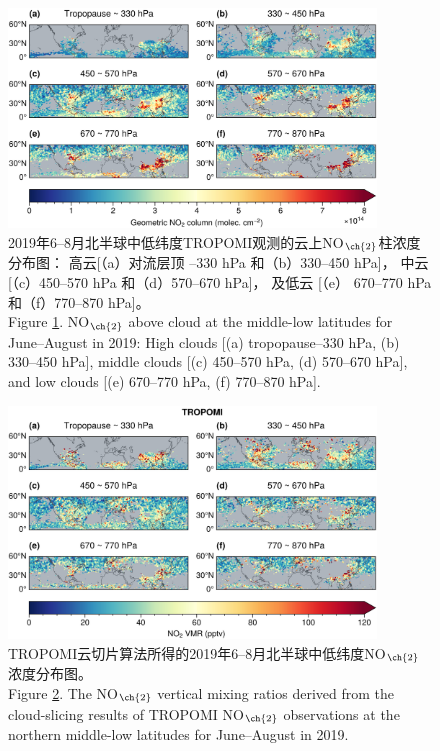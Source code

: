\begin{figure}[H]
    \centering
    \includegraphics[width=0.87\textwidth]{./figures/no2geo_tropomi.png}
    \caption{
    2019年6--8月北半球中低纬度TROPOMI观测的云上NO$_{\ch{2}}$柱浓度分布图：
    高云[（a）对流层顶 --330 hPa 和（b）330--450 hPa]，
    中云 [（c）450--570 hPa 和（d）570--670 hPa]，
    及低云 [（e） 670--770 hPa 和（f）770--870 hPa]。 \\
    Figure \ref{fig:no2geo_tropomi}. NO$_{\ch{2}}$ above cloud at the middle-low latitudes for June--August in 2019:
    High clouds [(a) tropopause--330 hPa, (b) 330--450 hPa],
    middle clouds [(c) 450--570 hPa, (d) 570--670 hPa],
    and low clouds [(e) 670--770 hPa, (f) 770--870 hPa].
    }
    \label{fig:no2geo_tropomi}
\end{figure}


\begin{figure}[H]
    \centering
    \includegraphics[width=0.87\textwidth]{./figures/utno2_tropomi.png}
    \caption{
    TROPOMI云切片算法所得的2019年6--8月北半球中低纬度NO$_{\ch{2}}$浓度分布图。 \\
    Figure \ref{fig:utno2_tropomi}. The NO$_{\ch{2}}$ vertical mixing ratios derived from the cloud-slicing results of TROPOMI NO$_{\ch{2}}$ observations at the northern middle-low latitudes for June--August in 2019.
    }
    \label{fig:utno2_tropomi}
\end{figure}


